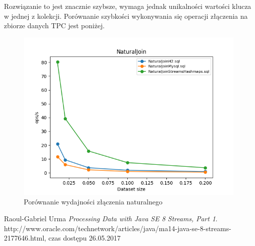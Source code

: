 \documentclass[12pt]{extarticle}
\begin{document}
Rozwiązanie to jest znacznie szybsze, wymaga jednak unikalności wartości klucza w jednej z kolekcji. Porównanie szybkości wykonywania się operacji złączenia na zbiorze danych TPC jest poniżej.


\begin{figure}[H]
\centering
\includegraphics[width=13cm]{plots/NaturalJoin}
\caption{Porównanie wydajności złączenia naturalnego}
\end{figure}

\begin{thebibliography}{9}
Raoul-Gabriel Urma
\textit{Processing Data with Java SE 8 Streams, Part 1}. 
http://www.oracle.com/technetwork/articles/java/ma14-java-se-8-streams-2177646.html, czas dostępu 26.05.2017
 
\end{thebibliography}
\end{document}
